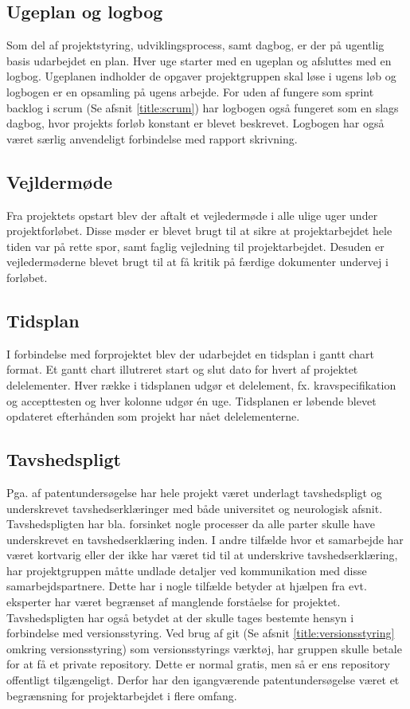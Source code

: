 \subsection{Ugeplan og logbog}
Som del af projektstyring, udviklingsprocess, samt dagbog, er der på ugentlig basis udarbejdet en plan. Hver uge starter med en ugeplan og afsluttes med en logbog. Ugeplanen indholder de opgaver projektgruppen skal løse i ugens løb og logbogen er en opsamling på ugens arbejde. For uden af fungere som sprint backlog i scrum (Se afsnit \ref{title:scrum}) har logbogen også fungeret som en slags dagbog, hvor projekts forløb konstant er blevet beskrevet. Logbogen har også været særlig anvendeligt forbindelse med rapport skrivning. 

\subsection{Vejldermøde}
Fra projektets opstart blev der aftalt et vejledermøde i alle ulige uger under projektforløbet. Disse møder er blevet brugt til at sikre at projektarbejdet hele tiden var på rette spor, samt faglig vejledning til projektarbejdet. Desuden er vejledermøderne blevet brugt til at få kritik på færdige dokumenter undervej i forløbet. 

\subsection{Tidsplan}
I forbindelse med forprojektet blev der udarbejdet en tidsplan i gantt chart format. Et gantt chart illutreret start og slut dato for hvert af projektet delelementer. Hver række i tidsplanen udgør et delelement, fx. kravspecifikation og accepttesten og hver kolonne udgør én uge. Tidsplanen er løbende blevet opdateret efterhånden som projekt har nået delelementerne.  

\subsection{Tavshedspligt} \label{title:tavshedspligt}
Pga. af patentundersøgelse har hele projekt været underlagt tavshedspligt og underskrevet tavshedserklæringer med både universitet og neurologisk afsnit. Tavshedspligten har bla. forsinket nogle processer da alle parter skulle have underskrevet en tavshedserklæring inden. I andre tilfælde hvor et samarbejde har været kortvarig eller der ikke har været tid til at underskrive tavshedserklæring, har projektgruppen måtte undlade detaljer ved kommunikation med disse samarbejdspartnere. Dette har i nogle tilfælde betyder at hjælpen fra evt. eksperter har været begrænset af manglende forståelse for projektet. Tavshedspligten har også betydet at der skulle tages bestemte hensyn i forbindelse med versionsstyring. Ved brug af git (Se afsnit \ref{title:versionsstyring} omkring versionsstyring) som versionsstyrings værktøj, har gruppen skulle betale for at få et private repository. Dette er normal gratis, men så er ens repository offentligt tilgængeligt. 
Derfor har den igangværende patentundersøgelse været et begrænsning for projektarbejdet i flere omfang. 

